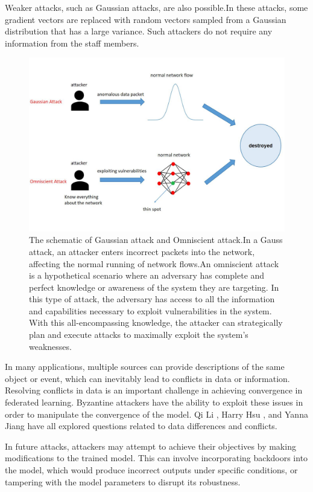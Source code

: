 \documentclass[conference]{IEEEtran}
\begin{document}
Weaker attacks, such as Gaussian attacks, are also possible.In these attacks, some gradient vectors are replaced with random vectors sampled from a Gaussian distribution that has a large variance.
Such attackers do not require any information from the staff members.

\begin{figure}[htbp]
    \centerline{\includegraphics[width=0.8\linewidth,height=0.6\linewidth]{picture/gause.jpg}}
    \caption{The schematic of Gaussian attack and Omniscient attack.In a Gauss attack, an attacker enters incorrect packets into the network, affecting the normal running of network flows.An omniscient attack is a hypothetical scenario where an adversary has complete and perfect knowledge or awareness of the system they are targeting. In this type of attack, the adversary has access to all the information and capabilities necessary to exploit vulnerabilities in the system. With this all-encompassing knowledge, the attacker can strategically plan and execute attacks to maximally exploit the system’s weaknesses.
    }
    \label{fig14}
\end{figure}

In many applications, multiple sources can provide descriptions of the same object or event, which 
can inevitably lead to conflicts in data or information. Resolving conflicts in data is an important
challenge in achieving convergence in federated learning. Byzantine attackers have the ability to 
exploit these issues in order to manipulate the convergence of the model. 
Qi Li \cite{b122}, Harry Hsu \cite{b123}, and Yanna Jiang \cite{b124} have all explored questions related to data differences and conflicts.

In future attacks, attackers may attempt to achieve their objectives by making modifications to the 
trained model. This can involve incorporating backdoors into the model, which would produce 
incorrect outputs under specific conditions, or tampering with the model parameters to disrupt its robustness. 
\end{document}

